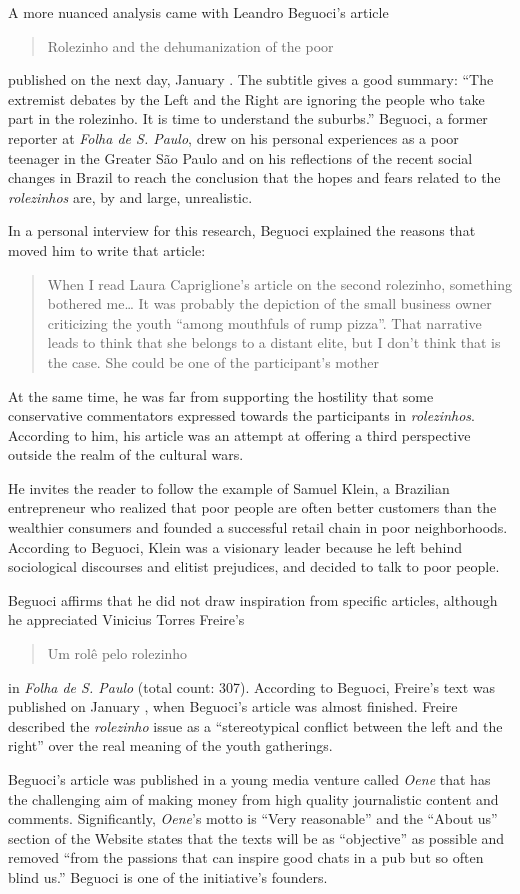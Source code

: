 A more nuanced analysis came with Leandro Beguoci's article \blockcquote{beguoci_rolezinhos}{Rolezinho and the dehumanization of the poor} published on the next day, January . The subtitle gives a good summary: \enquote{The extremist debates by the Left and the Right are ignoring the people who take part in the rolezinho. It is time to understand the suburbs.} Beguoci, a former reporter at \emph{Folha de S. Paulo}, drew on his personal experiences as a poor teenager in the Greater São Paulo and on his reflections of the recent social changes in Brazil to reach the conclusion that the hopes and fears related to the \emph{rolezinhos} are, by and large, unrealistic.

In a personal interview for this research, Beguoci explained the reasons that moved him to write that article: \blockcquote{interview_beguoci}[.]{When I read Laura Capriglione's article \autocite{folha_laura} on the second rolezinho, something bothered me\ldots{} It was probably the depiction of the small business owner criticizing the youth \enquote{among mouthfuls of rump pizza}. That narrative leads to think that she belongs to a distant elite, but I don't think that is the case. She could be one of the participant's mother} At the same time, he was far from supporting the hostility that some conservative commentators expressed towards the participants in \emph{rolezinhos}. According to him, his article was an attempt at offering a third perspective outside the realm of the cultural wars.

He invites the reader to follow the example of Samuel Klein, a Brazilian entrepreneur who realized that poor people are often better customers than the wealthier consumers and founded a successful retail chain in poor neighborhoods. According to Beguoci, Klein was a visionary leader because he left behind sociological discourses and elitist prejudices, and decided to talk to poor people.

Beguoci affirms that he did not draw inspiration from specific articles, although he appreciated Vinicius Torres Freire's \blockcquote{folha_vinicius}{Um rolê pelo rolezinho} in \emph{Folha de S. Paulo} (total count: 307). According to Beguoci, Freire's text was published on January , when Beguoci's article was almost finished. Freire described the \emph{rolezinho} issue as a \enquote{stereotypical conflict between the left and the right} over the real meaning of the youth gatherings.

Beguoci's article was published in a young media venture called \emph{Oene} that has the challenging aim of making money from high quality journalistic content and comments. Significantly, \emph{Oene}'s motto is \enquote{Very reasonable} and the \enquote{About us} section \autocite{oene_sobre} of the Website states that the texts will be as \enquote{objective} as possible and removed \enquote{from the passions that can inspire good chats in a pub but so often blind us.} Beguoci is one of the initiative's founders.

